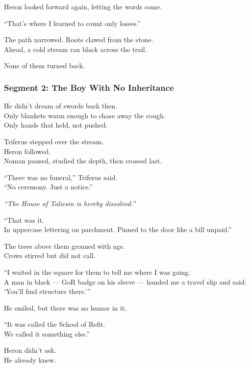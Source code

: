 \documentclass[9pt]{article}
\begin{document}
Heron looked forward again, letting the words come.

“That’s where I learned to count only losses.”

\vspace{1em}

The path narrowed. Roots clawed from the stone.\\
Ahead, a cold stream ran black across the trail.

None of them turned back.

\newpage


\subsubsection*{Segment 2: The Boy With No Inheritance}

He didn’t dream of swords back then.\\
Only blankets warm enough to chase away the cough.\\
Only hands that held, not pushed.

\vspace{1em}

Triferus stepped over the stream.\\
Heron followed.\\
Noman paused, studied the depth, then crossed last.

“There was no funeral,” Triferus said.\\
“No ceremony. Just a notice.”

\textit{“The House of Taliesin is hereby dissolved.”}

“That was it.\\
In uppercase lettering on parchment. Pinned to the door like a bill unpaid.”

\vspace{1em}

The trees above them groaned with age.\\
Crows stirred but did not call.

“I waited in the square for them to tell me where I was going.\\
A man in black — GoR badge on his sleeve — handed me a travel slip and said: ‘You’ll find structure there.’”

He smiled, but there was no humor in it.

“It was called the School of Refit.\\
We called it something else.”

Heron didn’t ask.\\
He already knew.
\end{document}

